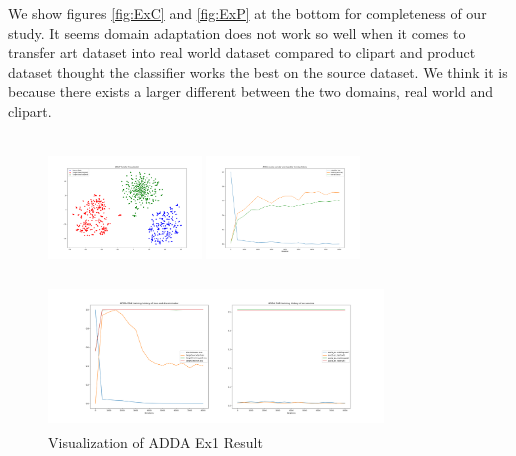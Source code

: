 \documentclass[conference]{IEEEtran}
\begin{document}
We show figures \ref{fig:ExC} and \ref{fig:ExP} at the bottom for completeness of our study. It seems domain adaptation does not work so well when it comes to transfer art dataset into real world dataset compared to clipart and product dataset thought the classifier works the best on the source dataset. We think it is because there exists a larger different between the two domains, real world and clipart.
\begin{figure}[htb]

\centering
\begin{minipage}[t]{0.26\textwidth}
\includegraphics[width=1.6in, height=1.5in]{Ladda/A2R_no_preassign_no_dec_no_bn/ADDA_visual.png}
\end{minipage}%
\begin{minipage}[t]{0.26\textwidth}
\includegraphics[width=1.6in, height=1.5in]{Ladda/A2R_no_preassign_no_dec_no_bn/clf.png}
\end{minipage}%
\begin{minipage}[t]{0.45\textwidth}
\includegraphics[width=3.5in, height=1.5in]{Ladda/A2R_no_preassign_no_dec_no_bn/gan.png}
\end{minipage}%
\caption{Visualization of ADDA Ex1 Result}\label{fig:Ex1}
\end{figure}
\end{document}
